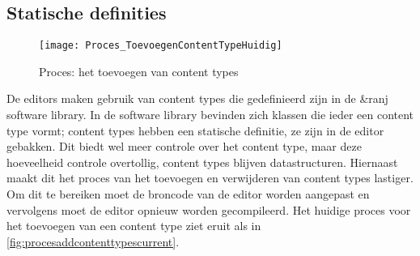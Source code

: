 \pagebreak

\subsection{Statische definities}
\begin{wrapfigure}{r}{0.4\textwidth}
    \texttt{[image: Proces\_ToevoegenContentTypeHuidig]}
    \caption{Proces: het toevoegen van content types}
    \label{fig:procesaddcontenttypescurrent}
    \centering
\end{wrapfigure}
De editors maken gebruik van content types die gedefinieerd zijn in de \&ranj software library. In de software library bevinden zich klassen die ieder een content type vormt; content types hebben een statische definitie, ze zijn in de editor gebakken. Dit biedt wel meer controle over het content type, maar deze hoeveelheid controle overtollig, content types blijven datastructuren. Hiernaast maakt dit het proces van het toevoegen en verwijderen van content types lastiger. Om dit te bereiken moet de broncode van de editor worden aangepast en vervolgens moet de editor opnieuw worden gecompileerd. Het huidige proces voor het toevoegen van een content type ziet eruit als in \autoref{fig:procesaddcontenttypescurrent}.

